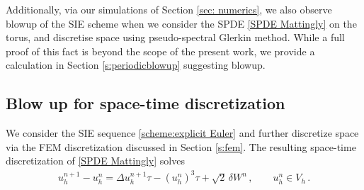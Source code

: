 \documentclass[reqno, 11pt]{amsart}
\theoremstyle{plain}
\theoremstyle{definition}
\theoremstyle{remark}
\numberwithin{equation}{section}
\numberwithin{theorem}{section}
\begin{document}
{Additionally, via our simulations of Section \ref{sec: numerics}, we also observe blowup of the SIE scheme when we consider the SPDE \eqref{SPDE Mattingly} on the torus, and discretise space using pseudo-spectral Glerkin method. While a full proof of this fact is beyond the scope of the present work, we provide a calculation in Section \ref{s:periodicblowup} suggesting blowup.






\subsection{Blow up for space-time discretization}\label{subsec: Can blow up proof}

We consider the SIE sequence \eqref{scheme:explicit Euler} and further discretize space via the FEM discretization discussed in Section \ref{s:fem}. The resulting space-time discretization of \eqref{SPDE Mattingly}   solves
\begin{align}\label{sch1}
u_h^{n+1}-u_h^n=\Delta u_h^{n+1} \tau -(u^n_h)^3 \tau+\sqrt{2}\, \delta W^n \, ,\qquad u_h^n\in V_h \,.
\end{align}


}
\end{document}

